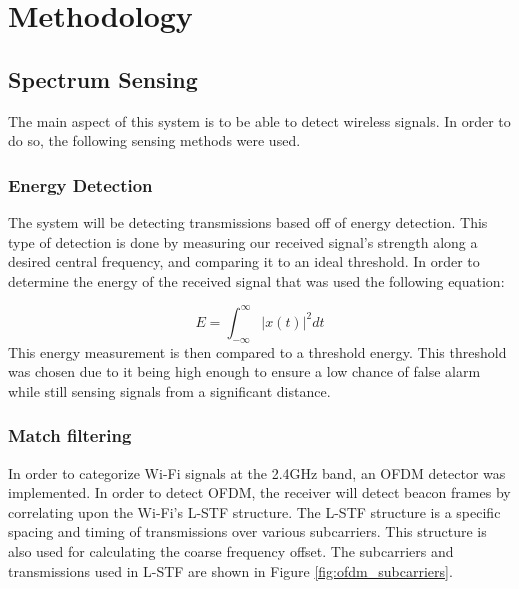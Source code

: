 \chapter{Methodology}
\section{Spectrum Sensing}
The main aspect of this system is to be able to detect wireless signals. In order to do so, the following sensing methods were used.
\subsection{Energy Detection}
The system will be detecting transmissions based off of energy detection. This type of detection is done by measuring our received signal’s strength along a desired central frequency, and comparing it to an ideal threshold. In order to determine the energy of the received signal that was used the following equation:\par 
\[E = \int_{-\infty}^{\infty}| x(t) |^2dt\]
This energy measurement is then compared to a threshold energy. This threshold was chosen due to it being high enough to ensure a low chance of false alarm while still sensing signals from a significant distance. \par 


\subsection{Match filtering}
In order to categorize Wi-Fi signals at the 2.4GHz band, an OFDM detector was implemented. In order to detect OFDM, the receiver will detect beacon frames by correlating upon the Wi-Fi’s L-STF structure. The L-STF structure is a specific spacing and timing of transmissions over various subcarriers. This structure is also used for calculating the coarse frequency offset. The subcarriers and transmissions used in L-STF are shown in Figure \ref{fig:ofdm_subcarriers}. \par 

